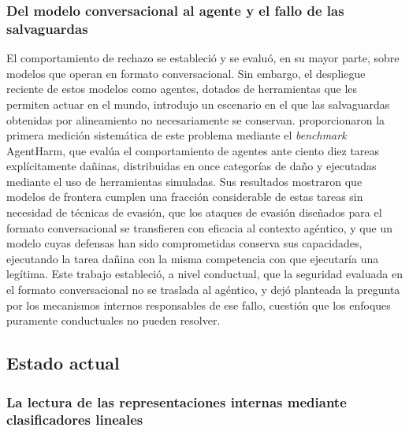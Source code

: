 \documentclass[12pt,a4paper]{article}
\newcommand{\textcite}[1]{\citet{#1}}
\begin{document}
\subsubsection*{Del modelo conversacional al agente y el fallo de las salvaguardas}

\justifying

El comportamiento de rechazo se estableció y se evaluó, en su mayor parte, sobre modelos que operan en formato conversacional. Sin embargo, el despliegue reciente de estos modelos como agentes, dotados de herramientas que les permiten actuar en el mundo, introdujo un escenario en el que las salvaguardas obtenidas por alineamiento no necesariamente se conservan. \textcite{andriushchenko2024} proporcionaron la primera medición sistemática de este problema mediante el \textit{benchmark} AgentHarm, que evalúa el comportamiento de agentes ante ciento diez tareas explícitamente dañinas, distribuidas en once categorías de daño y ejecutadas mediante el uso de herramientas simuladas. Sus resultados mostraron que modelos de frontera cumplen una fracción considerable de estas tareas sin necesidad de técnicas de evasión, que los ataques de evasión diseñados para el formato conversacional se transfieren con eficacia al contexto agéntico, y que un modelo cuyas defensas han sido comprometidas conserva sus capacidades, ejecutando la tarea dañina con la misma competencia con que ejecutaría una legítima. Este trabajo estableció, a nivel conductual, que la seguridad evaluada en el formato conversacional no se traslada al agéntico, y dejó planteada la pregunta por los mecanismos internos responsables de ese fallo, cuestión que los enfoques puramente conductuales no pueden resolver.

\subsection{Estado actual}

\subsubsection*{La lectura de las representaciones internas mediante clasificadores lineales}

\justifying
\end{document}
